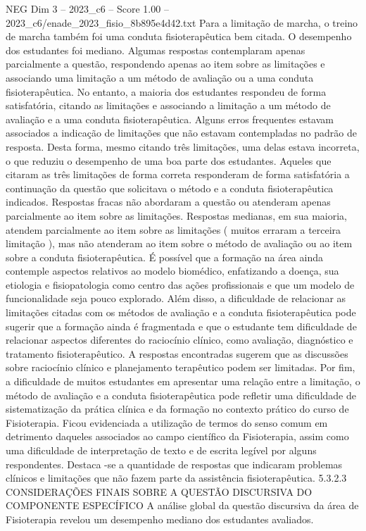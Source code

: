 \begin{textsample}{NEG Dim 3 – 2023\_c6 – Score 1.00 – 2023\_c6/enade\_2023\_fisio\_8b895e4d42.txt}
Para a limitação de marcha, o treino de marcha também foi uma conduta fisioterapêutica bem citada.
O desempenho dos estudantes foi mediano.
Algumas respostas contemplaram apenas parcialmente a questão, respondendo apenas ao item sobre as limitações e associando uma limitação a um método de avaliação ou a uma conduta fisioterapêutica.
No entanto, a maioria dos estudantes respondeu de forma satisfatória, citando as limitações e associando a limitação a um método de avaliação e a uma conduta fisioterapêutica.
Alguns erros frequentes estavam associados a indicação de limitações que não estavam contempladas no padrão de resposta.
Desta forma, mesmo citando três limitações, uma delas estava incorreta, o que reduziu o desempenho de uma boa parte dos estudantes.
Aqueles que citaram as três limitações de forma correta responderam de forma satisfatória a continuação da questão que solicitava o método e a conduta fisioterapêutica indicados.
Respostas fracas não abordaram a questão ou atenderam apenas parcialmente ao item sobre as limitações.
Respostas medianas, em sua maioria, atendem parcialmente ao item sobre as limitações ( muitos erraram a terceira limitação ), mas não atenderam ao item sobre o método de avaliação ou ao item sobre a conduta fisioterapêutica.
É possível que a formação na área ainda contemple aspectos relativos ao modelo biomédico, enfatizando a doença, sua etiologia e fisiopatologia como centro das ações profissionais e que um modelo de funcionalidade seja pouco explorado.
Além disso, a dificuldade de relacionar as limitações citadas com os métodos de avaliação e a conduta fisioterapêutica pode sugerir que a formação ainda é fragmentada e que o estudante tem dificuldade de relacionar aspectos diferentes do raciocínio clínico, como avaliação, diagnóstico e tratamento fisioterapêutico.
A respostas encontradas sugerem que as discussões sobre raciocínio clínico e planejamento terapêutico podem ser limitadas.
Por fim, a dificuldade de muitos estudantes em apresentar uma relação entre a limitação, o método de avaliação e a conduta fisioterapêutica pode refletir uma dificuldade de sistematização da prática clínica e da formação no contexto prático do curso de Fisioterapia.
Ficou evidenciada a utilização de termos do senso comum em detrimento daqueles associados ao campo científico da Fisioterapia, assim como uma dificuldade de interpretação de texto e de escrita legível por alguns respondentes.
Destaca -se a quantidade de respostas que indicaram problemas clínicos e limitações que não fazem parte da assistência fisioterapêutica. 5.3.2.3 CONSIDERAÇÕES FINAIS SOBRE A QUESTÃO DISCURSIVA DO COMPONENTE ESPECÍFICO A análise global da questão discursiva da área de Fisioterapia revelou um desempenho mediano dos estudantes avaliados.

\end{textsample}
